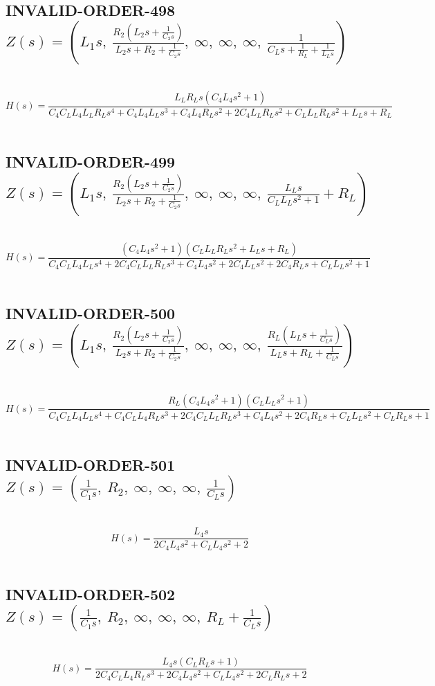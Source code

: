 \documentclass{article}
\begin{document}
\subsection{INVALID-ORDER-498 $Z(s) = \left( L_{1} s, \  \frac{R_{2} \left(L_{2} s + \frac{1}{C_{2} s}\right)}{L_{2} s + R_{2} + \frac{1}{C_{2} s}}, \  \infty, \  \infty, \  \infty, \  \frac{1}{C_{L} s + \frac{1}{R_{L}} + \frac{1}{L_{L} s}}\right)$ } \ 
\textbf{\[H(s) = \frac{L_{L} R_{L} s \left(C_{4} L_{4} s^{2} + 1\right)}{C_{4} C_{L} L_{4} L_{L} R_{L} s^{4} + C_{4} L_{4} L_{L} s^{3} + C_{4} L_{4} R_{L} s^{2} + 2 C_{4} L_{L} R_{L} s^{2} + C_{L} L_{L} R_{L} s^{2} + L_{L} s + R_{L}}\] } \ 
\subsection{INVALID-ORDER-499 $Z(s) = \left( L_{1} s, \  \frac{R_{2} \left(L_{2} s + \frac{1}{C_{2} s}\right)}{L_{2} s + R_{2} + \frac{1}{C_{2} s}}, \  \infty, \  \infty, \  \infty, \  \frac{L_{L} s}{C_{L} L_{L} s^{2} + 1} + R_{L}\right)$ } \ 
\textbf{\[H(s) = \frac{\left(C_{4} L_{4} s^{2} + 1\right) \left(C_{L} L_{L} R_{L} s^{2} + L_{L} s + R_{L}\right)}{C_{4} C_{L} L_{4} L_{L} s^{4} + 2 C_{4} C_{L} L_{L} R_{L} s^{3} + C_{4} L_{4} s^{2} + 2 C_{4} L_{L} s^{2} + 2 C_{4} R_{L} s + C_{L} L_{L} s^{2} + 1}\] } \ 
\subsection{INVALID-ORDER-500 $Z(s) = \left( L_{1} s, \  \frac{R_{2} \left(L_{2} s + \frac{1}{C_{2} s}\right)}{L_{2} s + R_{2} + \frac{1}{C_{2} s}}, \  \infty, \  \infty, \  \infty, \  \frac{R_{L} \left(L_{L} s + \frac{1}{C_{L} s}\right)}{L_{L} s + R_{L} + \frac{1}{C_{L} s}}\right)$ } \ 
\textbf{\[H(s) = \frac{R_{L} \left(C_{4} L_{4} s^{2} + 1\right) \left(C_{L} L_{L} s^{2} + 1\right)}{C_{4} C_{L} L_{4} L_{L} s^{4} + C_{4} C_{L} L_{4} R_{L} s^{3} + 2 C_{4} C_{L} L_{L} R_{L} s^{3} + C_{4} L_{4} s^{2} + 2 C_{4} R_{L} s + C_{L} L_{L} s^{2} + C_{L} R_{L} s + 1}\] } \ 
\subsection{INVALID-ORDER-501 $Z(s) = \left( \frac{1}{C_{1} s}, \  R_{2}, \  \infty, \  \infty, \  \infty, \  \frac{1}{C_{L} s}\right)$ } \ 
\textbf{\[H(s) = \frac{L_{4} s}{2 C_{4} L_{4} s^{2} + C_{L} L_{4} s^{2} + 2}\] } \ 
\subsection{INVALID-ORDER-502 $Z(s) = \left( \frac{1}{C_{1} s}, \  R_{2}, \  \infty, \  \infty, \  \infty, \  R_{L} + \frac{1}{C_{L} s}\right)$ } \ 
\textbf{\[H(s) = \frac{L_{4} s \left(C_{L} R_{L} s + 1\right)}{2 C_{4} C_{L} L_{4} R_{L} s^{3} + 2 C_{4} L_{4} s^{2} + C_{L} L_{4} s^{2} + 2 C_{L} R_{L} s + 2}\] } \ 
\end{document}
